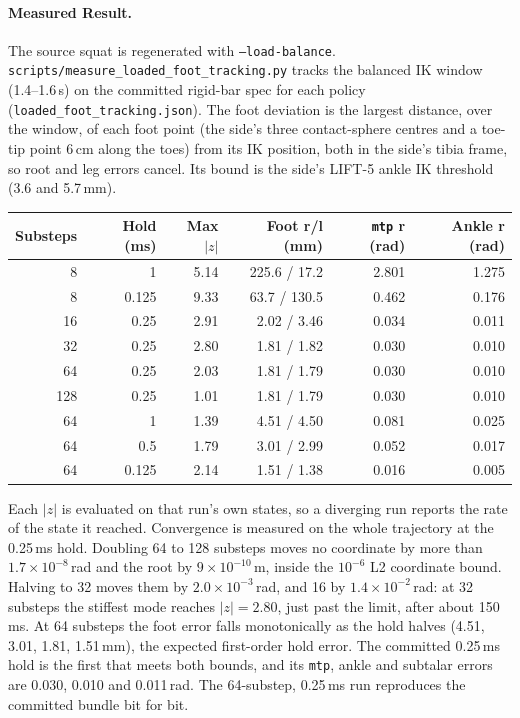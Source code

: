 \documentclass[11pt,a4paper]{article}
\begin{document}
\paragraph{Measured Result.} The source squat is regenerated with
\texttt{--load-balance}. \texttt{scripts/measure\_loaded\_foot\_tracking.py}
tracks the balanced IK window (1.4--1.6\,s) on the committed rigid-bar spec
for each policy (\texttt{loaded\_foot\_tracking.json}). The foot deviation is
the largest distance, over the window, of each foot point (the side's three
contact-sphere centres and a toe-tip point 6\,cm along the toes) from its IK
position, both in the side's tibia frame, so root and leg errors cancel. Its
bound is the side's LIFT-5 ankle IK threshold (3.6 and 5.7\,mm).
\begin{center}\small
\begin{tabular}{rrrrrr}
\toprule
Substeps & Hold (ms) & Max $|z|$ & Foot r/l (mm) & \texttt{mtp} r (rad) & Ankle r (rad)\\
\midrule
8 & 1 & 5.14 & 225.6 / 17.2 & 2.801 & 1.275\\
8 & 0.125 & 9.33 & 63.7 / 130.5 & 0.462 & 0.176\\
16 & 0.25 & 2.91 & 2.02 / 3.46 & 0.034 & 0.011\\
32 & 0.25 & 2.80 & 1.81 / 1.82 & 0.030 & 0.010\\
64 & 0.25 & 2.03 & 1.81 / 1.79 & 0.030 & 0.010\\
128 & 0.25 & 1.01 & 1.81 / 1.79 & 0.030 & 0.010\\
64 & 1 & 1.39 & 4.51 / 4.50 & 0.081 & 0.025\\
64 & 0.5 & 1.79 & 3.01 / 2.99 & 0.052 & 0.017\\
64 & 0.125 & 2.14 & 1.51 / 1.38 & 0.016 & 0.005\\
\bottomrule
\end{tabular}
\end{center}
Each $|z|$ is evaluated on that run's own states, so a diverging run reports
the rate of the state it reached. Convergence is measured on the whole
trajectory at the 0.25\,ms hold. Doubling 64 to 128 substeps moves no
coordinate by more than $1.7\times10^{-8}$\,rad and the root by
$9\times10^{-10}$\,m, inside the $10^{-6}$ L2 coordinate bound. Halving to 32
moves them by $2.0\times10^{-3}$\,rad, and 16 by $1.4\times10^{-2}$\,rad: at
32 substeps the stiffest mode reaches $|z|=2.80$, just past the limit, after
about 150\,ms. At 64 substeps the foot error falls monotonically as the hold
halves (4.51, 3.01, 1.81, 1.51\,mm), the expected first-order hold error.
The committed 0.25\,ms hold is the first that meets both bounds, and its
\texttt{mtp}, ankle and subtalar errors are 0.030, 0.010 and 0.011\,rad. The
64-substep, 0.25\,ms run reproduces the committed bundle bit for bit.
\end{document}

